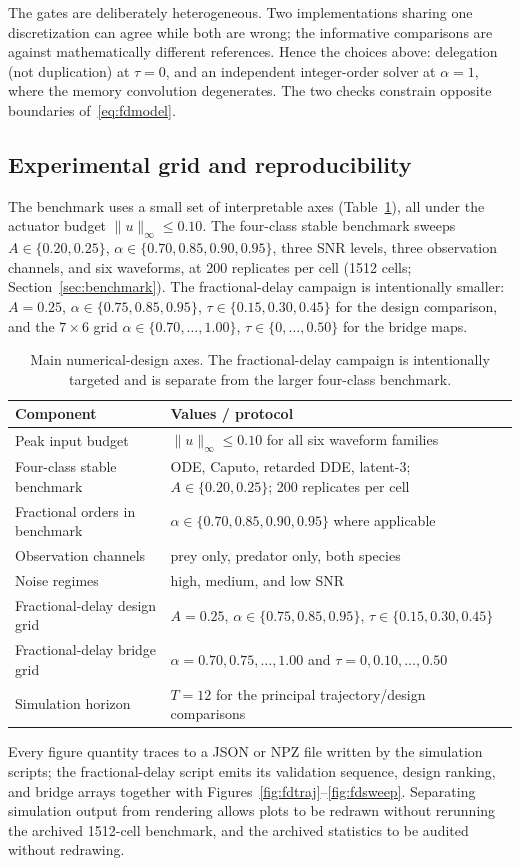 The gates are deliberately heterogeneous. Two implementations sharing one discretization can agree while both are wrong; the informative comparisons are against mathematically different references. Hence the choices above: delegation (not duplication) at $\tau=0$, and an independent integer-order solver at $\alpha=1$, where the memory convolution degenerates. The two checks constrain opposite boundaries of~\eqref{eq:fdmodel}.

\subsection{Experimental grid and reproducibility}
The benchmark uses a small set of interpretable axes (Table~\ref{tab:experiment-grid}), all under the actuator budget $\|u\|_\infty\le0.10$. The four-class stable benchmark sweeps $A\in\{0.20,0.25\}$, $\alpha\in\{0.70,0.85,0.90,0.95\}$, three SNR levels, three observation channels, and six waveforms, at 200 replicates per cell (1512 cells; Section~\ref{sec:benchmark}). The fractional-delay campaign is intentionally smaller: $A=0.25$, $\alpha\in\{0.75,0.85,0.95\}$, $\tau\in\{0.15,0.30,0.45\}$ for the design comparison, and the $7\times6$ grid $\alpha\in\{0.70,\ldots,1.00\}$, $\tau\in\{0,\ldots,0.50\}$ for the bridge maps.

\begin{table}[htbp]
\centering
\caption{Main numerical-design axes. The fractional-delay campaign is intentionally targeted and is separate from the larger four-class benchmark.}
\label{tab:experiment-grid}
\small
\begin{tabular}{p{}p{}}
\hline
\textbf{Component} & \textbf{Values / protocol}\\
\hline
Peak input budget & $\|u\|_\infty\le0.10$ for all six waveform families\\
Four-class stable benchmark & ODE, Caputo, retarded DDE, latent-$3$; $A\in\{0.20,0.25\}$; 200 replicates per cell\\
Fractional orders in benchmark & $\alpha\in\{0.70,0.85,0.90,0.95\}$ where applicable\\
Observation channels & prey only, predator only, both species\\
Noise regimes & high, medium, and low SNR\\
Fractional-delay design grid & $A=0.25$, $\alpha\in\{0.75,0.85,0.95\}$, $\tau\in\{0.15,0.30,0.45\}$\\
Fractional-delay bridge grid & $\alpha=0.70,0.75,\ldots,1.00$ and $\tau=0,0.10,\ldots,0.50$\\
Simulation horizon & $T=12$ for the principal trajectory/design comparisons\\
\hline
\end{tabular}
\end{table}

Every figure quantity traces to a JSON or NPZ file written by the simulation scripts; the fractional-delay script emits its validation sequence, design ranking, and bridge arrays together with Figures~\ref{fig:fdtraj}--\ref{fig:fdsweep}. Separating simulation output from rendering allows plots to be redrawn without rerunning the archived 1512-cell benchmark, and the archived statistics to be audited without redrawing.
